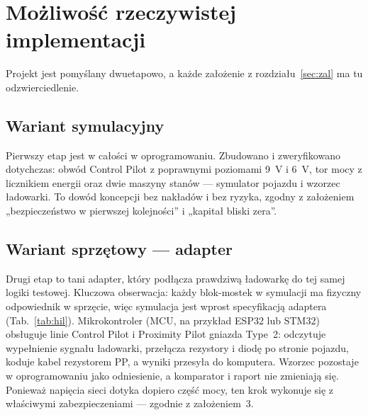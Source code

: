 \documentclass[11pt]{article}
\newcommand{\key}[1]{#1}
\begin{document}
\section{Możliwość rzeczywistej implementacji}\label{sec:impl}

Projekt jest pomyślany dwuetapowo, a każde założenie z rozdziału~\ref{sec:zal} ma tu odzwierciedlenie.

\subsection{Wariant symulacyjny}

Pierwszy etap jest w całości w oprogramowaniu. Zbudowano i zweryfikowano dotychczas: obwód Control Pilot z poprawnymi poziomami 9~V i 6~V, tor mocy z licznikiem energii oraz dwie maszyny stanów --- symulator pojazdu i wzorzec ładowarki. To dowód koncepcji bez nakładów i bez ryzyka, zgodny z założeniem „bezpieczeństwo w pierwszej kolejności” i „kapitał bliski zera”.

\subsection{Wariant sprzętowy --- adapter}

Drugi etap to tani adapter, który podłącza prawdziwą ładowarkę do tej samej logiki testowej. Kluczowa obserwacja: każdy blok-mostek w symulacji ma fizyczny odpowiednik w sprzęcie, więc \key{symulacja jest wprost specyfikacją adaptera} (Tab.~\ref{tab:hil}). Mikrokontroler (MCU, na przykład ESP32 lub STM32) obsługuje linie Control Pilot i Proximity Pilot gniazda Type~2: odczytuje wypełnienie sygnału ładowarki, przełącza rezystory i diodę po stronie pojazdu, koduje kabel rezystorem PP, a wyniki przesyła do komputera. Wzorzec pozostaje w oprogramowaniu jako odniesienie, a komparator i raport nie zmieniają się. Ponieważ napięcia sieci dotyka dopiero część mocy, ten krok wykonuje się z właściwymi zabezpieczeniami --- zgodnie z założeniem~3.
\end{document}
